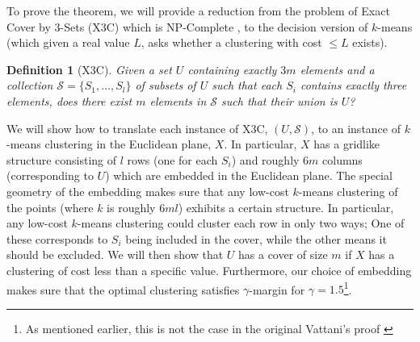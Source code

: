 \documentclass{article}
\newcommand{\mc}{\mathcal}
\newtheorem{definition}[theorem]{Definition}
\begin{document}
To prove the theorem, we will provide a reduction from the problem of Exact Cover by 3-Sets (X3C) which is NP-Complete \cite{garey2002computers}, to the decision version of $k$-means (which given a real value $L$, asks whether a clustering with cost $\le L$ exists).

\begin{definition}[X3C]
Given a set $U$ containing exactly $3m$ elements and a collection $\mc S = \{S_1, \ldots, S_l\}$ of subsets of $U$ such that each $S_i$ contains exactly three elements, does there exist $m$ elements in $\mc S$ such that their union is $U$? 
\end{definition}

We will show how to translate each instance of X3C, $(U,\mc S)$, to an instance of $k$-means clustering in the Euclidean plane, $X$. In particular, $X$ has a gridlike structure consisting of $l$ rows (one for each $S_i$) and roughly $6m$ columns (corresponding to $U$) which are embedded in the Euclidean plane. The special geometry of the embedding makes sure that any low-cost $k$-means clustering of the points (where $k$ is roughly $6ml$) exhibits a certain structure. In particular, any low-cost $k$-means clustering could cluster each row in only two ways; One of these corresponds to $S_i$ being included in the cover, while the other means it should be excluded. We will then show that $U$ has a cover of size $m$ if $X$ has a clustering of cost less than a specific value. Furthermore, our choice of embedding makes sure that the optimal clustering satisfies $\gamma$-margin for $\gamma=1.5$\footnote{As mentioned earlier, this is not the case in the original Vattani's proof \cite{vattani2009hardness}}.

  
  
  
\end{document}
